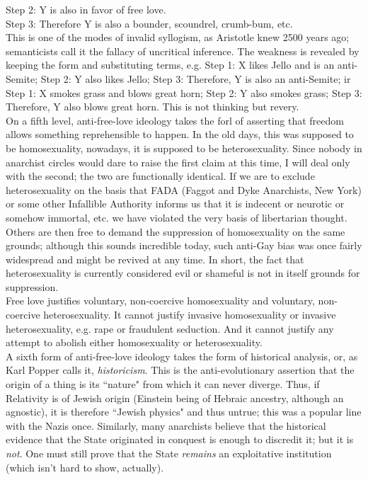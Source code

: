 \indent Step 2: Y is also in favor of free love.\\
\indent Step 3: Therefore Y is also a bounder, scoundrel, crumb-bum, etc.\\
This is one of the modes of invalid syllogism, as Aristotle knew 2500 years ago; semanticists call it the fallacy of uncritical inference. The weakness is revealed by keeping the form and substituting terms, e.g. Step 1: X likes Jello and is an anti-Semite; Step 2: Y also likes Jello; Step 3: Therefore, Y is also an anti-Semite; ir Step 1: X smokes grass and blows great horn; Step 2: Y also smokes grass; Step 3: Therefore, Y also blows great horn. This is not thinking but revery.\\
On a fifth level, anti-free-love ideology takes the forl of asserting that freedom allows something reprehensible to happen. In the old days, this was supposed to be homosexuality, nowadays, it is supposed to be heterosexuality. Since nobody in anarchist circles would dare to raise the first claim at this time, I will deal only with the second; the two are functionally identical. If we are to exclude heterosexuality on the basis that FADA (Faggot and Dyke Anarchists, New York) or some other Infallible Authority informs us that it is indecent or neurotic or somehow immortal, etc. we have violated the very basis of libertarian thought. Others are then free to demand the suppression of homosexuality on the same grounds; although this sounds incredible today, such anti-Gay bias was once fairly widespread and might be revived at any time. In short, the fact that heterosexuality is currently considered evil or shameful is not in itself grounds for suppression.\\
Free love justifies voluntary, non-coercive homosexuality and voluntary, non-coercive heterosexuality. It cannot justify invasive homosexuality or invasive heterosexuality, e.g. rape or fraudulent seduction. And it cannot justify any attempt to abolish either homosexuality or heterosexuality.\\
A sixth form of anti-free-love ideology takes the form of historical analysis, or, as Karl Popper calls it, \emph{historicism}. This is the anti-evolutionary assertion that the origin of a thing is its ``nature" from which it can never diverge. Thus, if Relativity is of Jewish origin (Einstein being of Hebraic ancestry, although an agnostic), it is therefore ``Jewish physics" and thus untrue; this was a popular line with the Nazis once. Similarly, many anarchists believe that the historical evidence that the State originated in conquest is enough to discredit it; but it is \emph{not}. One must still prove that the State \emph{remains} an exploitative institution (which isn't hard to show, actually).\\
